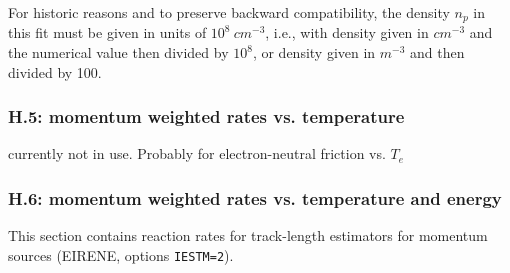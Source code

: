 \documentclass[12pt,dvips]{article}
\begin{document}
For historic reasons and to
preserve backward compatibility, the density $n_p$ in this fit must be
given in units of $10^8 \ cm^{-3}$, i.e., with density given in $cm^{-3}$ and
the numerical value then divided by $10^8$, or density given in $m^{-3}$ and then
divided by 100.
\subsubsection*{H.5: momentum weighted rates vs. temperature}
currently not in use. Probably for electron-neutral friction vs. $T_e$
\subsubsection*{H.6: momentum weighted rates vs. temperature and energy}
This section  contains reaction rates for track-length estimators for momentum sources (EIRENE, options {\tt IESTM=2}).
\end{document}
